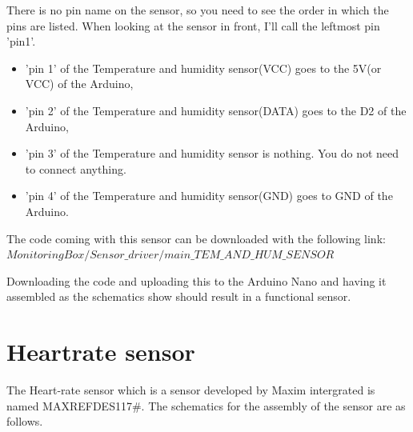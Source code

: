 \documentclass{report}
\begin{document}
There is no pin name on the sensor, so you need to see the order in which the pins are listed. When looking at the sensor in front, I'll call the leftmost pin 'pin1'.\\

\begin{itemize}
\item 'pin 1' of the Temperature and humidity sensor(VCC) goes to the 5V(or VCC) of the Arduino, 
\item 'pin 2' of the Temperature and humidity sensor(DATA) goes to the D2 of the Arduino,
\item 'pin 3' of the Temperature and humidity sensor is nothing. You do not need to connect anything.
\item 'pin 4' of the Temperature and humidity sensor(GND) goes to GND of the Arduino.
\end{itemize}
 
The code coming with this sensor can be downloaded with the following link: $ MonitoringBox/Sensor\_driver/main\_TEM\_AND\_HUM\_SENSOR $


Downloading the code and uploading this to the Arduino Nano and having it assembled as the schematics show should result in a functional sensor. 


\chapter{Heartrate sensor}
The Heart-rate sensor which is a sensor developed by Maxim intergrated is named MAXREFDES117\#. The schematics for the assembly of the sensor are as follows.\\
\end{document}
